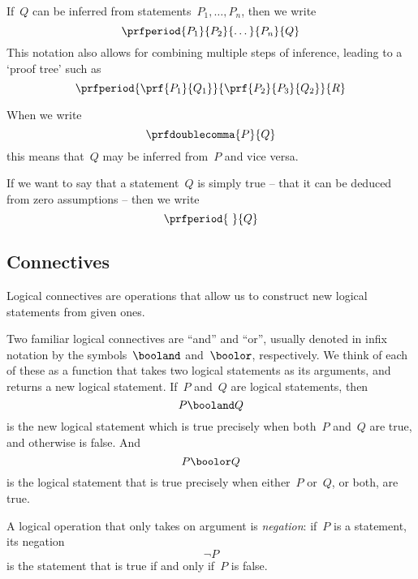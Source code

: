 If~$Q$ can be inferred from statements~$P_1, \ldots, P_n$, then we write
\begin{equation*}
    \prfperiod{
        P_1}{P_2}{\dots}{P_n}{Q}
\end{equation*}
This notation also allows for combining multiple steps of inference, leading to a `proof tree' such as
\begin{equation*}
    \prfperiod
    {\prf{P_1}{Q_1}}{\prf{P_2}{P_3}{Q_2}}{R}
\end{equation*}

When we write
\begin{equation*}
    \prfdoublecomma{
        P
    }{
        Q
    }
\end{equation*}
this means that~$Q$ may be inferred from~$P$ and vice versa.

If we want to say that a statement~$Q$ is simply true -- that it can be deduced from zero assumptions -- then we write
\begin{equation*}
    \prfperiod{
        \
    }{
        Q
    }
\end{equation*}

\subsection{Connectives}

Logical connectives are operations that allow us to construct new logical statements from given ones.

Two familiar logical connectives are ``and'' and ``or'', usually denoted in infix notation by the symbols~$\booland$ and~$\boolor$, respectively.
We think of each of these as a function that takes two logical statements as its arguments, and returns a new logical statement.
If~$P$ and~$Q$ are logical statements, then
%
\begin{equation*}
    P \booland Q
\end{equation*}
%
is the new logical statement which is true precisely when both~$P$ and~$Q$ are true, and otherwise is false.
And
\begin{equation*}
    P \boolor Q
\end{equation*}
is the logical statement that is true precisely when either~$P$ or~$Q$, or both, are true.

A logical operation that only takes on argument is \emph{negation}: if~$P$ is a statement, its negation
\begin{equation*}
    \lnot P
\end{equation*}
is the statement that is true if and only if~$P$ is false.


